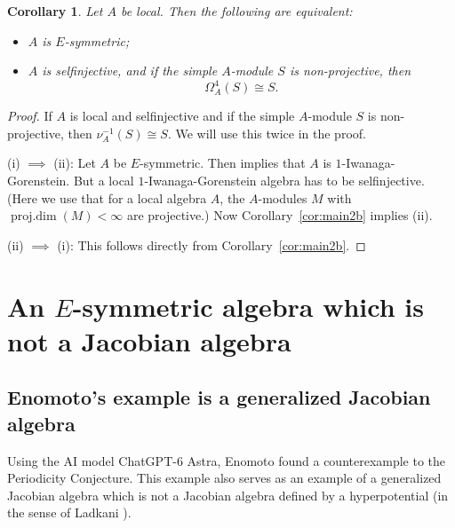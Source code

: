 \documentclass[12pt,reqno]{amsart}
\newtheorem{Cor}[Thm]{Corollary}
\theoremstyle{definition}
\newcommand{\pdim}{\operatorname{proj.dim}}
\begin{document}
\begin{Cor}\label{cor:main4b}
Let $A$ be local.
Then the following are equivalent:
\begin{itemize}\itemsep2mm

\item[(i)]
$A$ is $E$-symmetric;

\item[(ii)]
$A$ is selfinjective, and if the simple $A$-module $S$ is
non-projective, then
$$
\Omega_A^4(S) \cong S.
$$

\end{itemize}
\end{Cor}

\begin{proof}
If $A$ is local and selfinjective and if the simple $A$-module $S$ is
non-projective, then 
$\nu_A^{-1}(S) \cong S$.
We will use this twice in the proof.

(i) $\implies$ (ii):
Let $A$ be $E$-symmetric.
Then \cite[Theorem~1.7]{BS25} implies that $A$ is 
$1$-Iwanaga-Gorenstein. But a local $1$-Iwanaga-Gorenstein algebra has to be selfinjective.
(Here we use that for a local algebra $A$, the $A$-modules $M$ with 
$\pdim(M) < \infty$ are projective.)
Now Corollary~\ref{cor:main2b} implies (ii).

(ii) $\implies$ (i): 
This follows directly from 
Corollary~\ref{cor:main2b}.
\end{proof}


\section{An $E$-symmetric algebra which is not a Jacobian 
algebra}\label{sec:6}


\subsection{Enomoto's example is a generalized Jacobian algebra}
Using the AI model ChatGPT-6 Astra, 
Enomoto \cite{E26} found a counterexample to the Periodicity Conjecture.
This example also serves as an example of a generalized Jacobian algebra which is not a Jacobian algebra defined by a hyperpotential (in the sense of Ladkani \cite{L14}).
\end{document}
